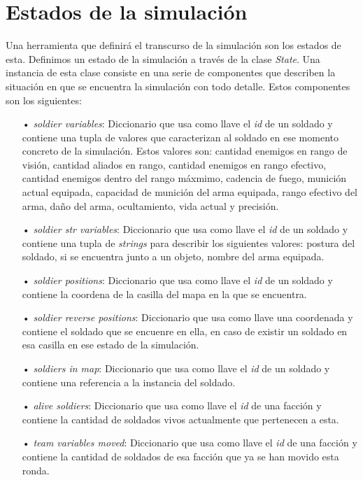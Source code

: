 \documentclass{llncs}
\begin{document}
\section{Estados de la simulaci\'on}

Una herramienta que definir\'a el transcurso de la simulaci\'on son los estados de esta. Definimos un estado de la simulaci\'on a trav\'es de la clase \emph{State}. Una instancia de esta clase consiste en una serie de componentes que describen la situaci\'on en que se encuentra la simulaci\'on con todo detalle. Estos componentes son los siguientes:\\

\begin{itemize}
\item[•] \emph{soldier variables}: Diccionario que usa como llave el \emph{id} de un soldado y contiene una tupla de valores que caracterizan al soldado en ese momento concreto de la simulaci\'on. Estos valores son: cantidad enemigos en rango de visi\'on, cantidad aliados en rango, cantidad enemigos en rango efectivo, cantidad enemigos dentro del rango m\'axmimo, cadencia de fuego, munici\'on actual equipada, capacidad de munici\'on del arma equipada, rango efectivo del arma, da\~no del arma, ocultamiento, vida actual y precisi\'on.
\item[•] \emph{soldier str variables}: Diccionario que usa como llave el \emph{id} de un soldado y contiene una tupla de \emph{strings} para describir los siguientes valores: postura del soldado, si se encuentra junto a un objeto, nombre del arma equipada.
\item[•] \emph{soldier positions}: Diccionario que usa como llave el \emph{id} de un soldado y contiene la coordena de la casilla del mapa en la que se encuentra.
\item[•] \emph{soldier reverse positions}: Diccionario que usa como llave una coordenada y contiene el soldado que se encuenre en ella, en caso de existir un soldado en esa casilla en ese estado de la simulaci\'on.
\item[•] \emph{soldiers in map}: Diccionario que usa como llave el \emph{id} de un soldado y contiene una referencia a la instancia del soldado.
\item[•] \emph{alive soldiers}: Diccionario que usa como llave el \emph{id} de una facci\'on y contiene la cantidad de soldados vivos actualmente que pertenecen a esta.
\item[•] \emph{team variables moved}: Diccionario que usa como llave el \emph{id} de una facci\'on y contiene la cantidad de soldados de esa facci\'on que ya se han movido esta ronda.

\end{itemize}
\end{document}
